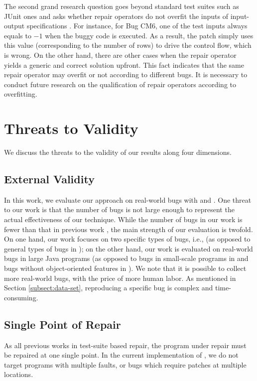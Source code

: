 The second grand research question goes beyond standard test suites such as JUnit ones and asks whether repair operators do not overfit the inputs of input-output specifications \cite{Smith15fse}. 
For instance, for Bug CM6, one of the test inputs always equals to $-1$ when the buggy code is executed. As a result, the patch simply uses this value (corresponding to the number of rows) to drive the control flow, which is wrong. On the other hand, there are other cases when the repair operator yields a generic and correct solution upfront. This fact indicates that the same repair operator may overfit or not according to different bugs. It is necessary to conduct future research on the qualification of repair operators according to overfitting. 

\section{Threats to Validity}
\label{sect:threats}

We discuss the threats to the validity of our results along four dimensions. 

\subsection{External Validity} 
\label{subsect:threat-number-bug}
In this work, we evaluate our approach on \numbug real-world bugs with \buggyconditions and \preconditions. One threat to our work is that the number of bugs is not large enough to represent the actual effectiveness of our technique. While the number of bugs in our work is fewer than that in previous work \cite{le2012genprog,nguyen2013semfix,Kim2013}, the main strength of our evaluation is twofold. On one hand, our work focuses on two specific types of bugs, i.e., \buggyandpres (as opposed to general types of bugs in \cite{Kim2013}); on the other hand, our work is evaluated on real-world bugs in large Java programs (as opposed to bugs in small-scale programs in \cite{nguyen2013semfix} and bugs without object-oriented features in \cite{le2012genprog}). We note that it is possible to collect more real-world bugs, with the price of more human labor. As mentioned in Section \ref{subsect:data-set}, reproducing a specific bug is complex and time-consuming. 

\subsection{Single Point of Repair} 
As all previous works in test-suite based repair, the program under repair must be repaired at one single point. In the current implementation of \nopol, we do not target programs with multiple faults, or bugs which require patches at multiple locations.

